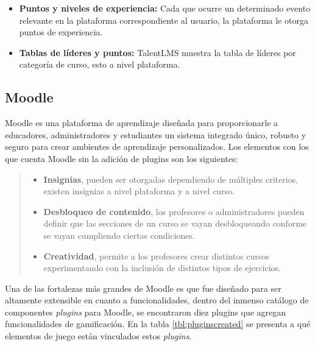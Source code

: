 \begin{multicols*}{2}
\begin{itemize}
        \item {\bf Puntos y niveles de experiencia:} Cada que ocurre un
            determinado evento relevante en la plataforma correspondiente al
            usuario, la plataforma le otorga puntos de experiencia.

        \item {\bf Tablas de líderes y puntos:} TalentLMS muestra la
            tabla de líderes por categoría de curso, esto a nivel plataforma.

    \end{itemize}

\end{multicols*}



\clearpage
\subsection{Moodle}

 Moodle \cite{PagMoodle} es una plataforma de aprendizaje diseñada para proporcionarle
 a educadores, administradores y estudiantes un sistema integrado único, robusto y seguro
 para crear ambientes de aprendizaje personalizados. Los elementos con los que cuenta
 Moodle sin la adición de plugins son los siguientes:

 \begin{quote}
 \begin{itemize}
    \item {\bf Insignias}, pueden ser otorgadas dependiendo de múltiples criterios,
                existen insignias a nivel plataforma y a nivel curso.

    \item {\bf Desbloqueo de contenido}, los profesores o administradores pueden
                definir que las secciones de un curso se vayan desbloqueando
                conforme se vayan cumpliendo ciertas condiciones.

    \item {\bf Creatividad}, permite a los profesores crear distintos cursos
                experimentando con la inclusión de distintos tipos de ejercicios.
 \end{itemize}
 \end{quote}

 \noindent Una de las fortalezas más grandes de Moodle es que fue diseñado para ser altamente
 extensible en cuanto a funcionalidades, dentro del inmenso catálogo de componentes {\it plugins}
 para Moodle, se encontraron diez plugins que agregan funcionalidades de gamificación. En la tabla
 \ref{tbl:pluginscreated} se presenta a qué elementos de juego están vinculados estos {\it plugins}.


